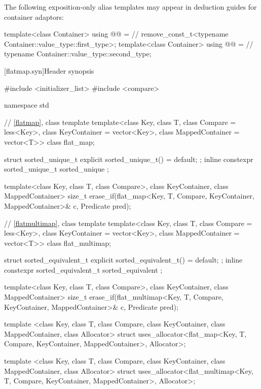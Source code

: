 \begin{addedblock}
\pnum
The following exposition-only alias templates may appear in deduction guides
for container adaptors:

\begin{codeblock}
  template<class Container>
    using @@ =                                // \expos
      remove_const_t<typename Container::value_type::first_type>;
  template<class Container>
    using @@ =                             // \expos
      typename Container::value_type::second_type;
\end{codeblock}
\end{addedblock}

\noindent\makebox[\linewidth]{\rule{\textwidth}{0.4pt}}

\setcounter{subsection}{3}
\begin{addedblock}
[flatmap.syn]{Header  synopsis}%
%

\begin{codeblock}
#include <initializer_list>
#include <compare>

namespace std {
  // \ref{flatmap}, class template 
  template<class Key, class T, class Compare = less<Key>,
           class KeyContainer = vector<Key>, class MappedContainer = vector<T>>
    class flat_map;

  struct sorted_unique_t { explicit sorted_unique_t() = default; };
  inline constexpr sorted_unique_t sorted_unique {};

  template<class Key, class T, class Compare>,
           class KeyContainer, class MappedContainer>
    size_t erase_if(flat_map<Key, T, Compare, KeyContainer, MappedContainer>& c,
                    Predicate pred);

  // \ref{flatmultimap}, class template 
  template<class Key, class T, class Compare = less<Key>,
           class KeyContainer = vector<Key>, class MappedContainer = vector<T>>
    class flat_multimap;

  struct sorted_equivalent_t { explicit sorted_equivalent_t() = default; };
  inline constexpr sorted_equivalent_t sorted_equivalent {};

  template<class Key, class T, class Compare>,
           class KeyContainer, class MappedContainer>
    size_t erase_if(flat_multimap<Key, T, Compare, KeyContainer, MappedContainer>& c,
                    Predicate pred);

  template <class Key, class T, class Compare,
            class KeyContainer,
            class MappedContainer, class Allocator>
    struct uses_allocator<flat_map<Key, T, Compare, KeyContainer, MappedContainer>,
                          Allocator>;

  template <class Key, class T, class Compare,
            class KeyContainer,
            class MappedContainer, class Allocator>
    struct uses_allocator<flat_multimap<Key, T, Compare, KeyContainer, MappedContainer>,
                          Allocator>;

}
\end{codeblock}
\end{addedblock}

